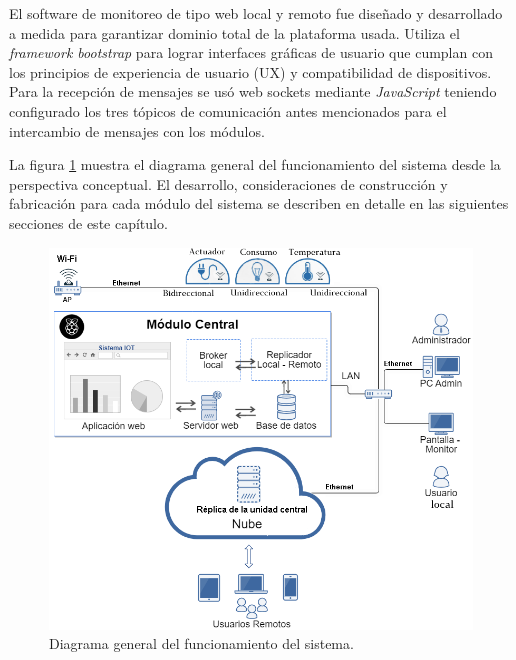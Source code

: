 El software de monitoreo de tipo web local y remoto fue diseñado y desarrollado a medida para garantizar dominio total de la plataforma usada. Utiliza el \emph{framework bootstrap} para lograr interfaces gráficas de usuario que cumplan con los principios de experiencia de usuario (UX) y compatibilidad de dispositivos. Para la recepción de mensajes se usó web sockets mediante \emph{JavaScript} teniendo configurado los tres tópicos de comunicación antes mencionados para el intercambio de mensajes con los módulos.

La figura \ref{fig:diagrama_general} muestra el diagrama general del funcionamiento del sistema desde la perspectiva conceptual. El desarrollo, consideraciones de construcción y fabricación para cada módulo del sistema se describen en detalle en las siguientes secciones de este capítulo.


\begin{figure}[htbp]
	\centering
	\includegraphics[width=1.0\textwidth]{./Figures/diagrama0.png}
	\caption{Diagrama general del funcionamiento del sistema.}

	\label{fig:diagrama_general}
\end{figure}




